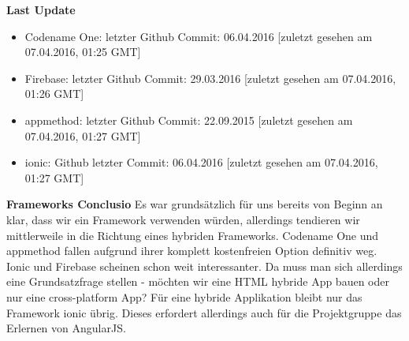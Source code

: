 \textbf{Last Update}
\begin{itemize}
\item Codename One: letzter Github Commit: 06.04.2016 [zuletzt gesehen am 07.04.2016, 01:25 GMT]
\item Firebase: letzter Github Commit: 29.03.2016 [zuletzt gesehen am 07.04.2016, 01:26 GMT]
\item appmethod: letzter Github Commit: 22.09.2015 [zuletzt gesehen am 07.04.2016, 01:27 GMT]
\item ionic: Github letzter Commit: 06.04.2016 [zuletzt gesehen am 07.04.2016, 01:27 GMT]
\end{itemize}

\textbf{Frameworks Conclusio}
Es war grundsätzlich für uns bereits von Beginn an klar, dass wir ein Framework verwenden würden, allerdings tendieren wir mittlerweile in die Richtung eines hybriden Frameworks. Codename One und appmethod fallen aufgrund ihrer komplett kostenfreien Option definitiv weg. Ionic und Firebase scheinen schon weit interessanter.
Da muss man sich allerdings eine Grundsatzfrage stellen - möchten wir eine HTML hybride App bauen oder nur eine cross-platform App? Für eine hybride Applikation bleibt nur das Framework ionic übrig. Dieses erfordert allerdings auch für die Projektgruppe das Erlernen von AngularJS.
\clearpage %